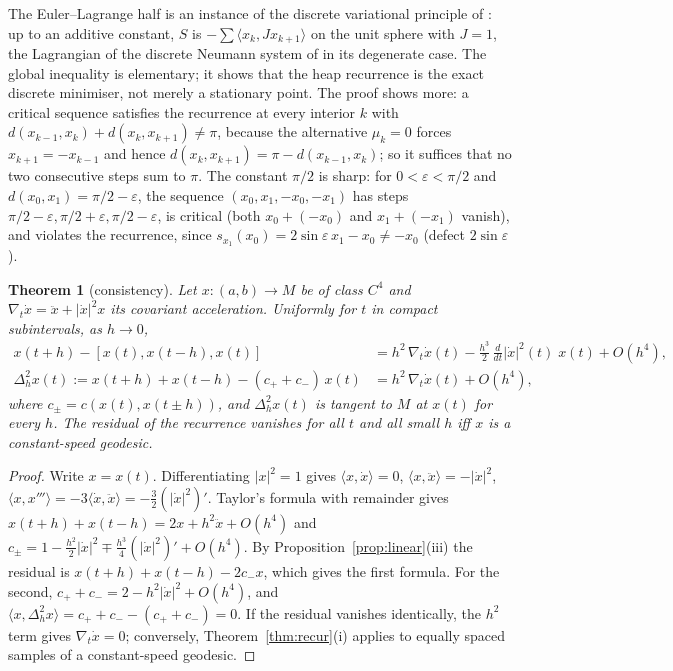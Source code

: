 \documentclass[11pt,reqno]{amsart}
\newtheorem{theorem}{Theorem}[section]
\theoremstyle{definition}
\theoremstyle{remark}
\numberwithin{equation}{section}
\newcommand{\ip}[2]{\langle #1,#2\rangle}
\newcommand{\hp}[3]{[#1,#2,#3]}
\begin{document}
The Euler--Lagrange half is an instance of the discrete variational principle of
\cite{Veselov88,MV,MW}: up to an additive constant, $S$ is $-\sum\ip{x_k}{Jx_{k+1}}$ on the unit sphere with
$J=1$, the Lagrangian of the discrete Neumann system of \cite{MV} in its degenerate case.  The global inequality is elementary; it shows that the heap
recurrence is the exact discrete minimiser, not merely a stationary point.  The proof shows more: a critical sequence satisfies the recurrence at every interior $k$ with
$d(x_{k-1},x_k)+d(x_k,x_{k+1})\ne\pi$, because the alternative $\mu_k=0$ forces $x_{k+1}=-x_{k-1}$ and hence
$d(x_k,x_{k+1})=\pi-d(x_{k-1},x_k)$; so it suffices that no two consecutive steps sum to $\pi$.  The constant $\pi/2$ is sharp: for
$0<\varepsilon<\pi/2$ and $d(x_0,x_1)=\pi/2-\varepsilon$, the sequence $(x_0,x_1,-x_0,-x_1)$ has steps
$\pi/2-\varepsilon,\pi/2+\varepsilon,\pi/2-\varepsilon$, is critical (both $x_0+(-x_0)$ and $x_1+(-x_1)$ vanish), and violates the recurrence,
since $s_{x_1}(x_0)=2\sin\varepsilon\,x_1-x_0\ne-x_0$ (defect $2\sin\varepsilon$).

\begin{theorem}[consistency]\label{thm:consist}
Let $x\colon(a,b)\to M$ be of class $C^4$ and $\nabla_t\dot x=\ddot x+\lvert\dot x\rvert^2x$ its covariant
acceleration.  Uniformly for $t$ in compact subintervals, as $h\to0$,
\begin{align*}
x(t+h)-\hp{x(t)}{x(t-h)}{x(t)}&=h^2\,\nabla_t\dot x(t)-\tfrac{h^3}2\,\tfrac{d}{dt}\lvert\dot x\rvert^2(t)\;x(t)+O(h^4),\\
\Delta_h^2x(t):=x(t+h)+x(t-h)-(c_++c_-)\,x(t)&=h^2\,\nabla_t\dot x(t)+O(h^4),
\end{align*}
where $c_\pm=c(x(t),x(t\pm h))$, and $\Delta_h^2x(t)$ is tangent to $M$ at $x(t)$ for every $h$.  The
residual of the recurrence vanishes for all $t$ and all small $h$ iff $x$ is a constant-speed geodesic.
\end{theorem}
\begin{proof}
Write $x=x(t)$.  Differentiating $\lvert x\rvert^2=1$ gives $\ip x{\dot x}=0$, $\ip x{\ddot x}=-\lvert\dot x\rvert^2$,
$\ip x{x'''}=-3\ip{\dot x}{\ddot x}=-\tfrac32(\lvert\dot x\rvert^2)'$.  Taylor's formula with remainder gives
$x(t+h)+x(t-h)=2x+h^2\ddot x+O(h^4)$ and
$c_\pm=1-\tfrac{h^2}2\lvert\dot x\rvert^2\mp\tfrac{h^3}4(\lvert\dot x\rvert^2)'+O(h^4)$.  By
Proposition~\ref{prop:linear}(iii) the residual is $x(t+h)+x(t-h)-2c_-x$, which gives the first formula.  For
the second, $c_++c_-=2-h^2\lvert\dot x\rvert^2+O(h^4)$, and $\ip x{\Delta_h^2x}=c_++c_--(c_++c_-)=0$.  If the
residual vanishes identically, the $h^2$ term gives $\nabla_t\dot x=0$; conversely,
Theorem~\ref{thm:recur}(i) applies to equally spaced samples of a constant-speed geodesic.
\end{proof}
\end{document}
